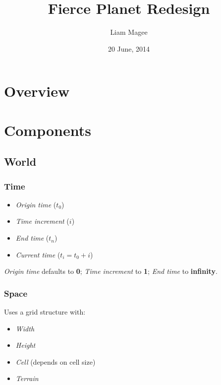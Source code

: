\documentclass[]{article}
\title{Fierce Planet Redesign}
\author{Liam Magee}
\date{20 June, 2014}
\begin{document}
\maketitle

{
\hypersetup{linkcolor=black}
\setcounter{tocdepth}{2}
\tableofcontents
}
\section{Overview}\label{overview}

\section{Components}\label{components}

\subsection{World}\label{world}

\subsubsection{Time}\label{time}

\begin{itemize}
\itemsep1pt\parskip0pt
\item
  \emph{Origin time} (\(t_0\))
\item
  \emph{Time increment} (\(i\))
\item
  \emph{End time} (\(t_n\))
\item
  \emph{Current time} (\(t_i = t_0 + i\))
\end{itemize}

\emph{Origin time} defaults to \textbf{0}; \emph{Time increment} to
\textbf{1}; \emph{End time} to \textbf{infinity}.

\subsubsection{Space}\label{space}

Uses a grid structure with:

\begin{itemize}
\itemsep1pt\parskip0pt
\item
  \emph{Width}
\item
  \emph{Height}
\item
  \emph{Cell} (depends on cell size)
\item
  \emph{Terrain}
\end{itemize}
\end{document}
